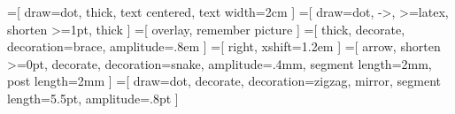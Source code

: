 



=[
    draw=dot,
    thick,
    text centered,
    text width=2cm
]
=[
    draw=dot,
    ->,
    >=latex,
    shorten >=1pt,
    thick
]
=[
    overlay,
    remember picture
]
=[
    thick,
    decorate,
    decoration={brace, amplitude=.8em}
]
=[
    right,
    xshift=1.2em
]
=[
    arrow,
    shorten >=0pt,
    decorate,
    decoration={snake, amplitude=.4mm, segment length=2mm, post length=2mm}
]
=[
    draw=dot,
    decorate,
    decoration={zigzag, mirror, segment length=5.5pt, amplitude=.8pt}
]

\newcommand{\ingray}[1]{\textcolor{light-gray}{#1}}

